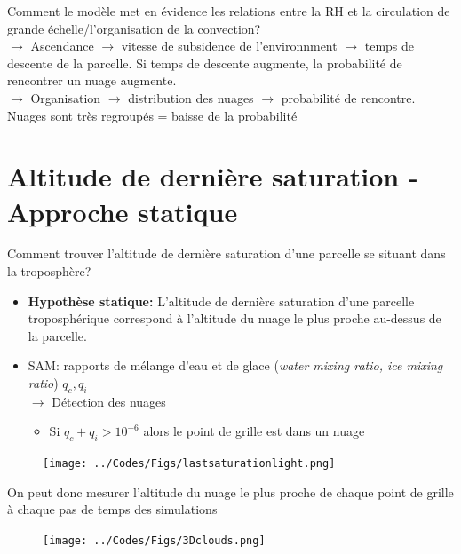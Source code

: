 \documentclass[10pt]{beamer}
\begin{document}
\begin{frame}{\secname}
    Comment le modèle met en évidence les relations entre la RH et la circulation de grande échelle/l'organisation de la convection? \\ \vspace{1cm}
    $\rightarrow$ Ascendance $\rightarrow$ vitesse de subsidence de l'environnment $\rightarrow$ temps de descente de la parcelle. Si temps de descente augmente, la probabilité de rencontrer un nuage augmente. \\ \vspace{1cm}
    $\rightarrow$ Organisation $\rightarrow$ distribution des nuages $\rightarrow$ probabilité de rencontre. Nuages sont très regroupés = baisse de la probabilité
\end{frame}

\section*{Altitude de dernière saturation - Approche statique}
\begin{frame}{\secname}
    Comment trouver l'altitude de dernière saturation d'une parcelle se situant dans la troposphère?
    \begin{itemize}
        \item \textbf{Hypothèse statique:} L'altitude de dernière saturation d'une parcelle troposphérique correspond à l'altitude du nuage le plus proche au-dessus de la parcelle.
        \item SAM: rapports de mélange d'eau et de glace (\textit{water mixing ratio, ice mixing ratio}) $q_c, q_i$ \\ 
        $\rightarrow$ Détection des nuages
        \begin{itemize}
            \item Si $q_c + q_i > 10^{-6}$ alors le point de grille est dans un nuage \autocite{Risi2021}
        \end{itemize}
    \end{itemize}
    \begin{figure}[hbtp]
        \centering
        \texttt{[image: ../Codes/Figs/lastsaturationlight.png]}
    \end{figure}
\end{frame}

\begin{frame}{\secname}
    On peut donc mesurer l'altitude du nuage le plus proche de chaque point de grille à chaque pas de temps des simulations
    \begin{figure}[hbtp]
        \centering
        \texttt{[image: ../Codes/Figs/3Dclouds.png]}
    \end{figure}
\end{frame}
\end{document}
